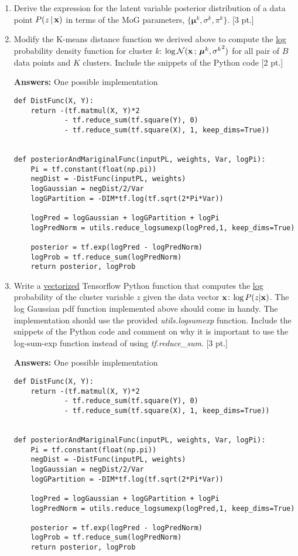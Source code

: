 \documentclass[12pt,letterpaper]{article}
\begin{document}
\begin{enumerate}

\item Derive the expression for the latent variable posterior distribution of a data point $P(z\, | \,\bold{x})$ in terms of the MoG parameters, $\{\boldsymbol{\mu}^k, \sigma^k, \pi^k\}$. [3 pt.]

\item Modify the K-means distance function we derived above to compute the \underline{log} probability density function for cluster $k$: $\log \mathcal{N}(\bold{x} \, ; \, \boldsymbol{\mu}^k, {\sigma^k}^2)$ for all pair of $B$ data points and $K$ clusters. Include the snippets of the Python code [2 pt.]

{\color{red}
  \textbf{Answers:}
  One possible implementation
}
\begin{verbatim}
def DistFunc(X, Y):
    return -(tf.matmul(X, Y)*2 
            - tf.reduce_sum(tf.square(Y), 0) 
            - tf.reduce_sum(tf.square(X), 1, keep_dims=True))


def posteriorAndMariginalFunc(inputPL, weights, Var, logPi):
    Pi = tf.constant(float(np.pi))
    negDist = -DistFunc(inputPL, weights)
    logGaussian = negDist/2/Var
    logGPartition = -DIM*tf.log(tf.sqrt(2*Pi*Var))

    logPred = logGaussian + logGPartition + logPi
    logPredNorm = utils.reduce_logsumexp(logPred,1, keep_dims=True)

    posterior = tf.exp(logPred - logPredNorm)
    logProb = tf.reduce_sum(logPredNorm)
    return posterior, logProb
\end{verbatim}

\item Write a \underline{vectorized} Tensorflow Python function that computes the \underline{log} probability of the cluster variable $z$ given the data vector $\bold{x}$: $\log P(z|\bold{x})$. The log Gaussian pdf function implemented above should come in handy. The implementation should use the provided \textit{utils.logsumexp} function. Include the snippets of the Python code and comment on why it is important to use the log-sum-exp function instead of using \textit{tf.reduce\_sum}. [3 pt.]

{\color{red}
  \textbf{Answers:}
  One possible implementation
}
\begin{verbatim}
def DistFunc(X, Y):
    return -(tf.matmul(X, Y)*2 
            - tf.reduce_sum(tf.square(Y), 0) 
            - tf.reduce_sum(tf.square(X), 1, keep_dims=True))


def posteriorAndMariginalFunc(inputPL, weights, Var, logPi):
    Pi = tf.constant(float(np.pi))
    negDist = -DistFunc(inputPL, weights)
    logGaussian = negDist/2/Var
    logGPartition = -DIM*tf.log(tf.sqrt(2*Pi*Var))

    logPred = logGaussian + logGPartition + logPi
    logPredNorm = utils.reduce_logsumexp(logPred,1, keep_dims=True)

    posterior = tf.exp(logPred - logPredNorm)
    logProb = tf.reduce_sum(logPredNorm)
    return posterior, logProb
\end{verbatim}

\end{enumerate}
\end{document}
